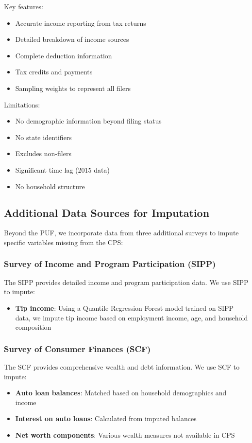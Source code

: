 Key features:
\begin{itemize}
\item Accurate income reporting from tax returns
\item Detailed breakdown of income sources
\item Complete deduction information
\item Tax credits and payments
\item Sampling weights to represent all filers
\end{itemize}

Limitations:
\begin{itemize}
\item No demographic information beyond filing status
\item No state identifiers
\item Excludes non-filers
\item Significant time lag (2015 data)
\item No household structure
\end{itemize}

\subsection{Additional Data Sources for Imputation}

Beyond the PUF, we incorporate data from three additional surveys to impute specific variables missing from the CPS:

\subsubsection{Survey of Income and Program Participation (SIPP)}

The SIPP provides detailed income and program participation data. We use SIPP to impute:
\begin{itemize}
\item \textbf{Tip income}: Using a Quantile Regression Forest model trained on SIPP data, we impute tip income based on employment income, age, and household composition
\end{itemize}

\subsubsection{Survey of Consumer Finances (SCF)}

The SCF provides comprehensive wealth and debt information. We use SCF to impute:
\begin{itemize}
\item \textbf{Auto loan balances}: Matched based on household demographics and income
\item \textbf{Interest on auto loans}: Calculated from imputed balances
\item \textbf{Net worth components}: Various wealth measures not available in CPS
\end{itemize}

